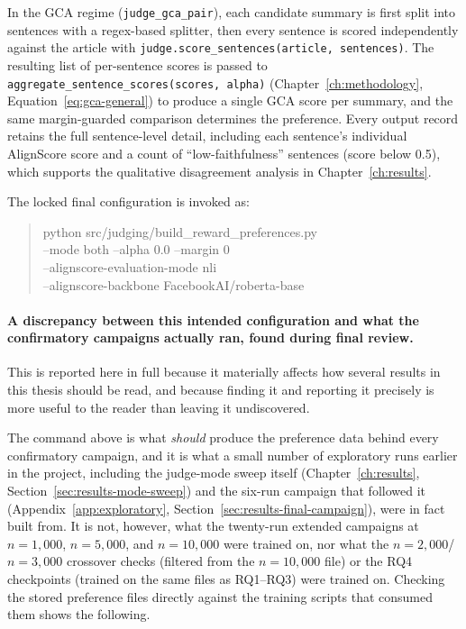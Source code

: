In the GCA regime (\texttt{judge\_gca\_pair}), each candidate summary is first
split into sentences with a regex-based splitter, then every sentence is scored
independently against the article with \texttt{judge.score\_sentences(article,\
sentences)}. The resulting list of per-sentence scores is passed to
\texttt{aggregate\_sentence\_scores(scores,\ alpha)}
(Chapter~\ref{ch:methodology}, Equation~\ref{eq:gca-general}) to produce a single
GCA score per summary, and the same margin-guarded comparison determines the
preference. Every output record retains the full sentence-level detail, including
each sentence's individual AlignScore score and a count of ``low-faithfulness''
sentences (score below 0.5), which supports the qualitative disagreement analysis
in Chapter~\ref{ch:results}.

The locked final configuration is invoked as:
\begin{quote}
\small\ttfamily
python src/judging/build\_reward\_preferences.py\\
\hspace*{1em}--mode both --alpha 0.0 --margin 0\\
\hspace*{1em}--alignscore-evaluation-mode nli\\
\hspace*{1em}--alignscore-backbone FacebookAI/roberta-base
\end{quote}

\paragraph{A discrepancy between this intended configuration and what the
confirmatory campaigns actually ran, found during final review.}
This is reported here in full because it materially affects how several
results in this thesis should be read, and because finding it and reporting
it precisely is more useful to the reader than leaving it undiscovered.

The command above is what \emph{should} produce the preference data behind
every confirmatory campaign, and it is what a small number of exploratory
runs earlier in the project, including the judge-mode sweep itself
(Chapter~\ref{ch:results}, Section~\ref{sec:results-mode-sweep}) and the
six-run campaign that followed it (Appendix~\ref{app:exploratory},
Section~\ref{sec:results-final-campaign}), were in fact built from. It is
not, however, what the twenty-run extended campaigns at $n=1{,}000$,
$n=5{,}000$, and $n=10{,}000$ were trained on, nor what the
$n=2{,}000$/$n=3{,}000$ crossover checks (filtered from the $n=10{,}000$
file) or the RQ4 checkpoints (trained on the same files as RQ1--RQ3) were
trained on. Checking the stored preference files directly against the
training scripts that consumed them shows the following.

